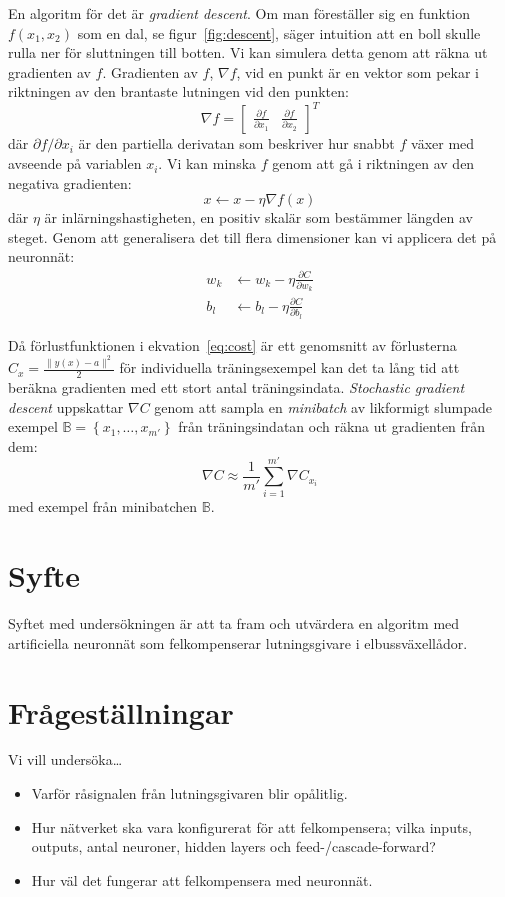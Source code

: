 En algoritm för det är \emph{gradient descent}.
Om man föreställer sig en funktion $ f(x_1, x_2) $ som en dal,
se figur~\ref{fig:descent},
säger intuition att en boll skulle rulla ner för sluttningen till botten.
Vi kan simulera detta genom att räkna ut gradienten av $ f $.
Gradienten av $ f $, $ \nabla f $, vid en punkt är en vektor
som pekar i riktningen av den brantaste lutningen vid den punkten:
\begin{equation}
	\nabla f = \begin{bmatrix} \frac{\partial f}{\partial x_1} & \frac{\partial f}{\partial x_2} \end{bmatrix}^{T}
\end{equation}
där $ \partial f / \partial x_i $ är den partiella derivatan
som beskriver hur snabbt $ f $ växer med avseende på variablen $ x_i $.
Vi kan minska $ f $ genom att gå i riktningen av den negativa gradienten:
\begin{equation}
	x \leftarrow x - \eta \nabla f(x)
\end{equation}
där $ \eta $ är inlärningshastigheten,
en positiv skalär som bestämmer längden av steget.
Genom att generalisera det till flera dimensioner kan vi
applicera det på neuronnät:
\begin{align}
	w_k &\leftarrow w_k - \eta \frac{\partial C}{\partial w_k} \\
	b_l &\leftarrow b_l - \eta \frac{\partial C}{\partial b_l}
\end{align}

Då förlustfunktionen i ekvation~\eqref{eq:cost} är ett genomsnitt av
förlusterna $ C_x = \frac{\lVert y(x) - a \rVert^2}{2} $ för individuella träningsexempel
kan det ta lång tid att beräkna gradienten med ett stort antal träningsindata.
\emph{Stochastic gradient descent} uppskattar $ \nabla C $ genom att
sampla en \emph{minibatch} av likformigt slumpade exempel
$ \mathbb{B} = \left\{ x_1, \dotsc, x_{m'} \right\} $ från träningsindatan
och räkna ut gradienten från dem:
\begin{equation}
	\nabla C \approx \frac{1}{m'} \sum^{m'}_{i=1} \nabla C_{x_i}
\end{equation}
med exempel från minibatchen $ \mathbb{B} $.

\section{Syfte}
Syftet med undersökningen är att ta fram och utvärdera en algoritm med
artificiella neuronnät som felkompenserar lutningsgivare i elbussväxellådor.

\section{Frågeställningar}
Vi vill undersöka\ldots
\begin{itemize}
	\item Varför råsignalen från lutningsgivaren blir opålitlig.
	\item Hur nätverket ska vara konfigurerat för att felkompensera; vilka inputs,
		outputs, antal neuroner, hidden layers och feed-/cascade-forward?
	\item Hur väl det fungerar att felkompensera med neuronnät.
\end{itemize}
